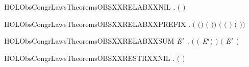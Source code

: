\newcommand{\HOLObsCongrLawsTheoremsOBSXXPREFXXRECXXEQUIV}{\UseVerbatim{HOLObsCongrLawsTheoremsOBSXXPREFXXRECXXEQUIV}}
\begin{SaveVerbatim}{HOLObsCongrLawsTheoremsOBSXXRELABXXNIL}
\HOLTokenTurnstile{} \HOLSymConst{\HOLTokenForall{}}.  \ensuremath{(}  \ensuremath{)} 
\end{SaveVerbatim}
\newcommand{\HOLObsCongrLawsTheoremsOBSXXRELABXXNIL}{\UseVerbatim{HOLObsCongrLawsTheoremsOBSXXRELABXXNIL}}
\begin{SaveVerbatim}{HOLObsCongrLawsTheoremsOBSXXRELABXXPREFIX}
\HOLTokenTurnstile{} \HOLSymConst{\HOLTokenForall{}}  .
        \ensuremath{(} \ensuremath{(}\HOLSymConst{\ensuremath{\ldotp}}\ensuremath{)} \ensuremath{(} \ensuremath{)}\ensuremath{)}
         \ensuremath{(} \ensuremath{(} \ensuremath{)} \HOLSymConst{\ensuremath{\ldotp}}  \ensuremath{(} \ensuremath{)}\ensuremath{)}
\end{SaveVerbatim}
\newcommand{\HOLObsCongrLawsTheoremsOBSXXRELABXXPREFIX}{\UseVerbatim{HOLObsCongrLawsTheoremsOBSXXRELABXXPREFIX}}
\begin{SaveVerbatim}{HOLObsCongrLawsTheoremsOBSXXRELABXXSUM}
\HOLTokenTurnstile{} \HOLSymConst{\HOLTokenForall{}} \ensuremath{\HOLBoundVar{E}\sp{\prime}} .
        \ensuremath{(} \ensuremath{(} \HOLSymConst{\ensuremath{+}} \ensuremath{\HOLBoundVar{E}\sp{\prime}}\ensuremath{)} \ensuremath{)} \ensuremath{(}   \HOLSymConst{\ensuremath{+}}  \ensuremath{\HOLBoundVar{E}\sp{\prime}} \ensuremath{)}
\end{SaveVerbatim}
\newcommand{\HOLObsCongrLawsTheoremsOBSXXRELABXXSUM}{\UseVerbatim{HOLObsCongrLawsTheoremsOBSXXRELABXXSUM}}
\begin{SaveVerbatim}{HOLObsCongrLawsTheoremsOBSXXRESTRXXNIL}
\HOLTokenTurnstile{} \HOLSymConst{\HOLTokenForall{}}.  \ensuremath{(}  \ensuremath{)} 
\end{SaveVerbatim}
